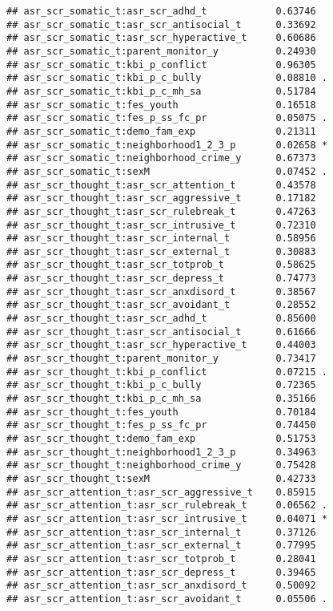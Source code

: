 \documentclass[
]{article}
\begin{document}
\begin{verbatim}
## asr_scr_somatic_t:asr_scr_adhd_t            0.63746    
## asr_scr_somatic_t:asr_scr_antisocial_t      0.33692    
## asr_scr_somatic_t:asr_scr_hyperactive_t     0.60686    
## asr_scr_somatic_t:parent_monitor_y          0.24930    
## asr_scr_somatic_t:kbi_p_conflict            0.96305    
## asr_scr_somatic_t:kbi_p_c_bully             0.08810 .  
## asr_scr_somatic_t:kbi_p_c_mh_sa             0.51784    
## asr_scr_somatic_t:fes_youth                 0.16518    
## asr_scr_somatic_t:fes_p_ss_fc_pr            0.05075 .  
## asr_scr_somatic_t:demo_fam_exp              0.21311    
## asr_scr_somatic_t:neighborhood1_2_3_p       0.02658 *  
## asr_scr_somatic_t:neighborhood_crime_y      0.67373    
## asr_scr_somatic_t:sexM                      0.07452 .  
## asr_scr_thought_t:asr_scr_attention_t       0.43578    
## asr_scr_thought_t:asr_scr_aggressive_t      0.17182    
## asr_scr_thought_t:asr_scr_rulebreak_t       0.47263    
## asr_scr_thought_t:asr_scr_intrusive_t       0.72310    
## asr_scr_thought_t:asr_scr_internal_t        0.58956    
## asr_scr_thought_t:asr_scr_external_t        0.30883    
## asr_scr_thought_t:asr_scr_totprob_t         0.58625    
## asr_scr_thought_t:asr_scr_depress_t         0.74773    
## asr_scr_thought_t:asr_scr_anxdisord_t       0.38567    
## asr_scr_thought_t:asr_scr_avoidant_t        0.28552    
## asr_scr_thought_t:asr_scr_adhd_t            0.85600    
## asr_scr_thought_t:asr_scr_antisocial_t      0.61666    
## asr_scr_thought_t:asr_scr_hyperactive_t     0.44003    
## asr_scr_thought_t:parent_monitor_y          0.73417    
## asr_scr_thought_t:kbi_p_conflict            0.07215 .  
## asr_scr_thought_t:kbi_p_c_bully             0.72365    
## asr_scr_thought_t:kbi_p_c_mh_sa             0.35166    
## asr_scr_thought_t:fes_youth                 0.70184    
## asr_scr_thought_t:fes_p_ss_fc_pr            0.74450    
## asr_scr_thought_t:demo_fam_exp              0.51753    
## asr_scr_thought_t:neighborhood1_2_3_p       0.34963    
## asr_scr_thought_t:neighborhood_crime_y      0.75428    
## asr_scr_thought_t:sexM                      0.42733    
## asr_scr_attention_t:asr_scr_aggressive_t    0.85915    
## asr_scr_attention_t:asr_scr_rulebreak_t     0.06562 .  
## asr_scr_attention_t:asr_scr_intrusive_t     0.04071 *  
## asr_scr_attention_t:asr_scr_internal_t      0.37126    
## asr_scr_attention_t:asr_scr_external_t      0.77995    
## asr_scr_attention_t:asr_scr_totprob_t       0.28041    
## asr_scr_attention_t:asr_scr_depress_t       0.39465    
## asr_scr_attention_t:asr_scr_anxdisord_t     0.50092    
## asr_scr_attention_t:asr_scr_avoidant_t      0.05506 .  

\end{verbatim}
\end{document}
